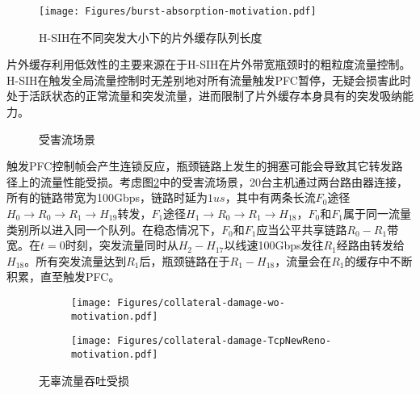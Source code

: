 \begin{figure}[H]
  \centering
  \texttt{[image: Figures/burst-absorption-motivation.pdf]}
  \caption{H-SIH在不同突发大小下的片外缓存队列长度}
  \label{c4:s1:ss1:fig:dram qlen motivation}
\end{figure}

片外缓存利用低效性的主要来源在于H-SIH在片外带宽瓶颈时的粗粒度流量控制。H-SIH在触发全局流量控制时无差别地对所有流量触发PFC暂停，无疑会损害此时处于活跃状态的正常流量和突发流量，进而限制了片外缓存本身具有的突发吸纳能力。



\begin{figure}[H]
  \centering
  \resizebox{0.5\linewidth}{!}{}
  \caption{受害流场景}
  \label{c4:s1:ss1:fig:victim flow scenario}
\end{figure}

触发PFC控制帧会产生连锁反应，瓶颈链路上发生的拥塞可能会导致其它转发路径上的流量性能受损。考虑图\ref{c4:s1:ss1:fig:victim flow scenario}中的受害流场景，20台主机通过两台路由器连接，所有的链路带宽为100Gbps，链路时延为$1us$，其中有两条长流$F_0$途径$H_0 \rightarrow R_0 \rightarrow R_1 \rightarrow H_{19}$转发，$F_1$途径$H_1 \rightarrow R_0 \rightarrow R_1 \rightarrow H_{18}$，$F_0$和$F_1$属于同一流量类别所以进入同一个队列。在稳态情况下，$F_0$和$F_1$应当公平共享链路$R_0-R_1$带宽。在$t=0$时刻，突发流量同时从$H_2-H_{17}$以线速100Gbps发往$R_1$经路由转发给$H_{18}$。所有突发流量达到$R_1$后，瓶颈链路在于$R_1-H_{18}$，流量会在$R_1$的缓存中不断积累，直至触发PFC。

\begin{figure}[H]
  \begin{subfigure}[b]{0.49\linewidth}
      \centering
      \texttt{[image: Figures/collateral-damage-wo-motivation.pdf]}
      \label{c3:s6:ss1:fig:sub1:f0 throughput w/o cc}
  \end{subfigure}
  \begin{subfigure}[b]{0.49\linewidth}
      \centering
      \texttt{[image: Figures/collateral-damage-TcpNewReno-motivation.pdf]}
      \label{c3:s6:ss1:fig:sub1:throughput of f0 new reno}
  \end{subfigure}
  \caption{无辜流量吞吐受损}
  \label{c3:s6:ss1:fig:throughput damage}
\end{figure}


